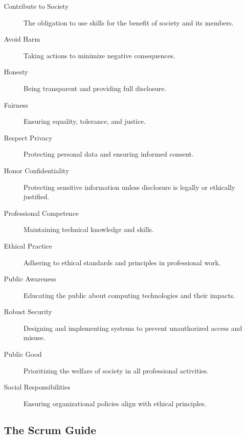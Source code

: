\documentclass{article}
\begin{document}
\begin{description}
  \item[Contribute to Society] The obligation to use skills for the benefit of society and its members.
  \item[Avoid Harm] Taking actions to minimize negative consequences.
  \item[Honesty] Being transparent and providing full disclosure.
  \item[Fairness] Ensuring equality, tolerance, and justice.
  \item[Respect Privacy] Protecting personal data and ensuring informed consent.
  \item[Honor Confidentiality] Protecting sensitive information unless disclosure is legally or ethically justified.
  \item[Professional Competence] Maintaining technical knowledge and skills.
  \item[Ethical Practice] Adhering to ethical standards and principles in professional work.
  \item[Public Awareness] Educating the public about computing technologies and their impacts.
  \item[Robust Security] Designing and implementing systems to prevent unauthorized access and misuse.
  \item[Public Good] Prioritizing the welfare of society in all professional activities.
  \item[Social Responsibilities] Ensuring organizational policies align with ethical principles.
\end{description}

\subsection{The Scrum Guide}
\end{document}
